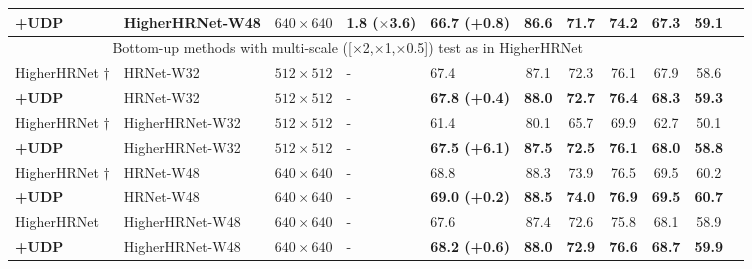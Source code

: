 \documentclass[10pt,journal,compsoc]{IEEEtran}
\begin{document}
\begin{table*}[t]
\begin{center}
\begin{tabular}{l|l|c|l|lcccccc}
\textbf{+UDP}                     &HigherHRNet-W48&$640\times640$         &\textbf{1.8 ($\times$3.6)}   &\textbf{66.7 (+0.8)}   & \textbf{86.6}    & \textbf{71.7}      & \textbf{74.2}     &\textbf{67.3}          &\textbf{59.1}\\
\hline
\multicolumn{9}{c}{Bottom-up methods with multi-scale ([$\times$2,$\times$1,$\times$0.5]) test as in HigherHRNet \cite{Higher}}\\
\hline
HigherHRNet \cite{Higher}$\dagger$&HRNet-W32&$512\times512$               &-     &67.4                   & 87.1             & 72.3               & 76.1              &67.9                   &58.6\\
\textbf{+UDP}                     &HRNet-W32&$512\times512$               &-     &\textbf{67.8 (+0.4)}          & \textbf{88.0}    & \textbf{72.7}      & \textbf{76.4}     &\textbf{68.3}          &\textbf{59.3}\\
HigherHRNet \cite{Higher}$\dagger$&HigherHRNet-W32&$512\times512$         &-     &61.4                   & 80.1             & 65.7               & 69.9              &62.7                   &50.1\\
\textbf{+UDP}                     &HigherHRNet-W32&$512\times512$         &-     &\textbf{67.5 (+6.1)}          & \textbf{87.5}    & \textbf{72.5}      & \textbf{76.1}     &\textbf{68.0}          &\textbf{58.8}\\
HigherHRNet \cite{Higher}$\dagger$&HRNet-W48      &$640\times640$         &-     &68.8                   & 88.3             & 73.9               & 76.5              &69.5                   &60.2\\
\textbf{+UDP}                     &HRNet-W48      &$640\times640$         &-     &\textbf{69.0 (+0.2)}   & \textbf{88.5}    & \textbf{74.0}      & \textbf{76.9}     &\textbf{69.5}          &\textbf{60.7}\\
HigherHRNet \cite{Higher}         &HigherHRNet-W48&$640\times640$         &-     &67.6                   & 87.4             & 72.6               & 75.8              &68.1                   &58.9\\
\textbf{+UDP}                     &HigherHRNet-W48&$640\times640$         &-     &\textbf{68.2 (+0.6)}   & \textbf{88.0}    & \textbf{72.9}      & \textbf{76.6}     &\textbf{68.7}          &\textbf{59.9}\\
\hline
\end{tabular}
\end{center}
\end{table*}
\end{document}
